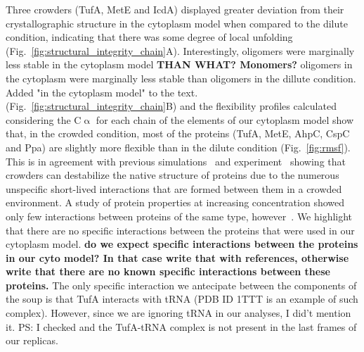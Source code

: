\documentclass[journal=jcisd8,manuscript=article]{achemso}
\begin{document}
Three crowders (TufA, MetE and IcdA) displayed greater deviation from
their crystallographic structure in the cytoplasm model when compared
to the dilute condition, indicating that there was some degree of
local unfolding
(Fig.~\ref{fig:structural_integrity_chain}A). Interestingly, oligomers
were marginally less stable {\color{blue} in the cytoplasm model} {\bf THAN WHAT? Monomers?} {\color{blue} oligomers in the cytoplasm were marginally less stable than oligomers in the dillute condition. Added "in the cytoplasm model" to the text.}
(Fig.~\ref{fig:structural_integrity_chain}B) and the flexibility
profiles calculated considering the C$\upalpha$ for each chain of the
elements of our cytoplasm model show that, in the crowded condition,
most of the proteins (TufA, MetE, AhpC, CspC and Ppa) are slightly
more flexible than in the dilute condition (Fig.~\ref{fig:rmsf}). This
is in agreement with previous simulations~\cite{Feig2011} and
experiment~\cite{miklos2011,Wang2012b} showing that crowders can
destabilize the native structure of proteins due to the numerous
unspecific short-lived interactions that are formed between them in a
crowded environment. A study of protein properties at increasing
concentration showed only few interactions between proteins of the
same type, however~\cite{Bashardanesh2019a}. {\color{blue} We highlight that there are no specific interactions between the proteins that were used in our cytoplasm model.} {\bf do we expect specific interactions between the proteins in our cyto model? In that case write that with references, otherwise write that there are no known specific interactions between these proteins.} {\color{blue} The only specific interaction we antecipate between the components of the soup is that TufA interacts with tRNA (PDB ID 1TTT is an example of such complex). However, since we are ignoring tRNA in our analyses, I did't mention it. PS: I checked and the TufA-tRNA complex is not present in the last frames of our replicas.}
\end{document}

